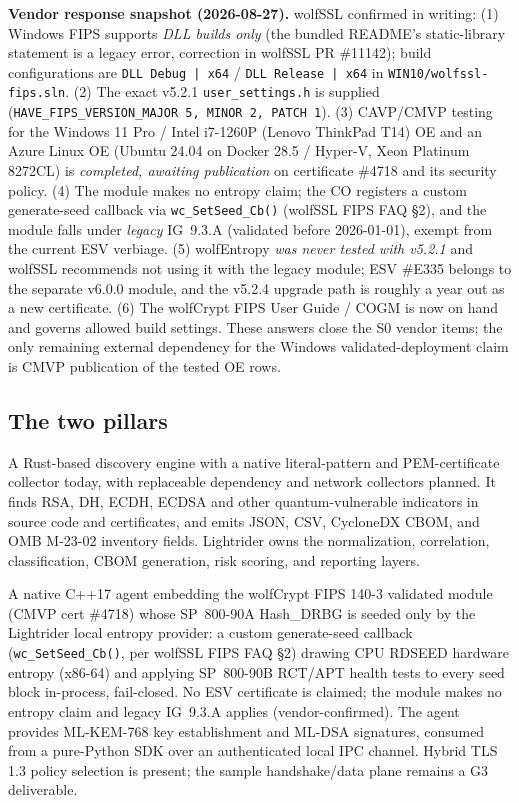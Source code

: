\documentclass[10pt]{article}
\newcommand{\code}[1]{\texttt{\small #1}}
\begin{document}
\textbf{Vendor response snapshot (2026-08-27).} wolfSSL confirmed in writing:
(1) Windows FIPS supports \emph{DLL builds only} (the bundled README's static-library
statement is a legacy error, correction in wolfSSL PR \#11142); build configurations are
\code{DLL Debug | x64} / \code{DLL Release | x64} in \code{WIN10/wolfssl-fips.sln}.
(2) The exact v5.2.1 \code{user\_settings.h} is supplied
(\code{HAVE\_FIPS\_VERSION\_MAJOR 5, MINOR 2, PATCH 1}).
(3) CAVP/CMVP testing for the Windows 11 Pro / Intel i7-1260P (Lenovo ThinkPad T14) OE
and an Azure Linux OE (Ubuntu 24.04 on Docker 28.5 / Hyper-V, Xeon Platinum 8272CL) is
\emph{completed, awaiting publication} on certificate \#4718 and its security policy.
(4) The module makes no entropy claim; the CO registers a custom generate-seed callback
via \code{wc\_SetSeed\_Cb()} (wolfSSL FIPS FAQ \S2), and the module falls under
\emph{legacy} IG~9.3.A (validated before 2026-01-01), exempt from the current ESV
verbiage. (5) wolfEntropy \emph{was never tested with v5.2.1} and wolfSSL recommends not
using it with the legacy module; ESV \#E335 belongs to the separate v6.0.0 module, and
the v5.2.4 upgrade path is roughly a year out as a new certificate. (6) The wolfCrypt
FIPS User Guide / COGM is now on hand and governs allowed build settings. These answers
close the S0 vendor items; the only remaining external dependency for the Windows
validated-deployment claim is CMVP publication of the tested OE rows.

\subsection*{The two pillars}
\begin{description}[style=nextline]
  \item[Pillar A: qSearch (cryptographic search).] A Rust-based discovery engine with
  a native literal-pattern and PEM-certificate collector today, with replaceable
  dependency and network collectors planned. It finds RSA, DH, ECDH, ECDSA and other
  quantum-vulnerable indicators in source code and certificates, and emits JSON, CSV,
  CycloneDX CBOM, and
  OMB M-23-02 inventory fields. Lightrider owns the normalization, correlation,
  classification, CBOM generation, risk scoring, and reporting layers.
  \item[Pillar B: Entropy generator and FIPS crypto core.] A native C++17 agent embedding
  the wolfCrypt FIPS 140-3 validated module (CMVP cert \#4718) whose SP~800-90A Hash\_DRBG
  is seeded only by the Lightrider local entropy provider: a custom generate-seed callback
  (\code{wc\_SetSeed\_Cb()}, per wolfSSL FIPS FAQ \S2) drawing CPU RDSEED hardware
  entropy (x86-64) and applying SP~800-90B RCT/APT health tests to every seed block
  in-process, fail-closed. No ESV
  certificate is claimed; the module makes no entropy claim and legacy IG~9.3.A applies
  (vendor-confirmed). The agent provides ML-KEM-768 key establishment and ML-DSA
  signatures, consumed from a pure-Python SDK over an authenticated local IPC channel.
  Hybrid TLS 1.3 policy selection is present; the sample handshake/data plane remains a
  G3 deliverable.
\end{description}
\end{document}
